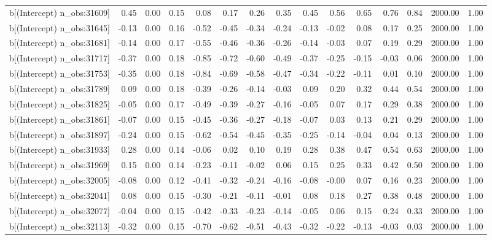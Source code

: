 \begin{table}[ht]
\begin{tabular}{rrrrrrrrrrrrrrr}
  b[(Intercept) n\_obs:31609] & 0.45 & 0.00 & 0.15 & 0.08 & 0.17 & 0.26 & 0.35 & 0.45 & 0.56 & 0.65 & 0.76 & 0.84 & 2000.00 & 1.00 \\ 
  b[(Intercept) n\_obs:31645] & -0.13 & 0.00 & 0.16 & -0.52 & -0.45 & -0.34 & -0.24 & -0.13 & -0.02 & 0.08 & 0.17 & 0.25 & 2000.00 & 1.00 \\ 
  b[(Intercept) n\_obs:31681] & -0.14 & 0.00 & 0.17 & -0.55 & -0.46 & -0.36 & -0.26 & -0.14 & -0.03 & 0.07 & 0.19 & 0.29 & 2000.00 & 1.00 \\ 
  b[(Intercept) n\_obs:31717] & -0.37 & 0.00 & 0.18 & -0.85 & -0.72 & -0.60 & -0.49 & -0.37 & -0.25 & -0.15 & -0.03 & 0.06 & 2000.00 & 1.00 \\ 
  b[(Intercept) n\_obs:31753] & -0.35 & 0.00 & 0.18 & -0.84 & -0.69 & -0.58 & -0.47 & -0.34 & -0.22 & -0.11 & 0.01 & 0.10 & 2000.00 & 1.00 \\ 
  b[(Intercept) n\_obs:31789] & 0.09 & 0.00 & 0.18 & -0.39 & -0.26 & -0.14 & -0.03 & 0.09 & 0.20 & 0.32 & 0.44 & 0.54 & 2000.00 & 1.00 \\ 
  b[(Intercept) n\_obs:31825] & -0.05 & 0.00 & 0.17 & -0.49 & -0.39 & -0.27 & -0.16 & -0.05 & 0.07 & 0.17 & 0.29 & 0.38 & 2000.00 & 1.00 \\ 
  b[(Intercept) n\_obs:31861] & -0.07 & 0.00 & 0.15 & -0.45 & -0.36 & -0.27 & -0.18 & -0.07 & 0.03 & 0.13 & 0.21 & 0.29 & 2000.00 & 1.00 \\ 
  b[(Intercept) n\_obs:31897] & -0.24 & 0.00 & 0.15 & -0.62 & -0.54 & -0.45 & -0.35 & -0.25 & -0.14 & -0.04 & 0.04 & 0.13 & 2000.00 & 1.00 \\ 
  b[(Intercept) n\_obs:31933] & 0.28 & 0.00 & 0.14 & -0.06 & 0.02 & 0.10 & 0.19 & 0.28 & 0.38 & 0.47 & 0.54 & 0.63 & 2000.00 & 1.00 \\ 
  b[(Intercept) n\_obs:31969] & 0.15 & 0.00 & 0.14 & -0.23 & -0.11 & -0.02 & 0.06 & 0.15 & 0.25 & 0.33 & 0.42 & 0.50 & 2000.00 & 1.00 \\ 
  b[(Intercept) n\_obs:32005] & -0.08 & 0.00 & 0.12 & -0.41 & -0.32 & -0.24 & -0.16 & -0.08 & -0.00 & 0.07 & 0.16 & 0.23 & 2000.00 & 1.00 \\ 
  b[(Intercept) n\_obs:32041] & 0.08 & 0.00 & 0.15 & -0.30 & -0.21 & -0.11 & -0.01 & 0.08 & 0.18 & 0.27 & 0.38 & 0.48 & 2000.00 & 1.00 \\ 
  b[(Intercept) n\_obs:32077] & -0.04 & 0.00 & 0.15 & -0.42 & -0.33 & -0.23 & -0.14 & -0.05 & 0.06 & 0.15 & 0.24 & 0.33 & 2000.00 & 1.00 \\ 
  b[(Intercept) n\_obs:32113] & -0.32 & 0.00 & 0.15 & -0.70 & -0.62 & -0.51 & -0.43 & -0.32 & -0.22 & -0.13 & -0.03 & 0.03 & 2000.00 & 1.00 \\ 

\end{tabular}
\end{table}
